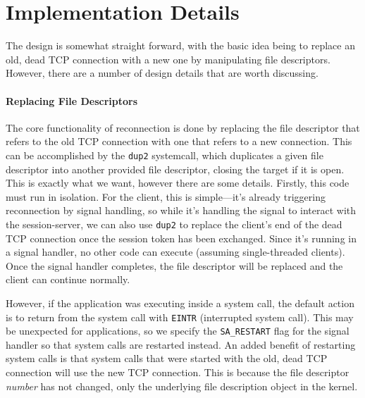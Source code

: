 \documentclass[twocolumn,11pt]{article}
\begin{document}
\section{Implementation Details}
\label{sec:impl}

The design is somewhat straight forward, with the basic idea being to replace an
old, dead TCP connection with a new one by manipulating file descriptors.
However, there are a number of design details that are worth discussing.

\paragraph{Replacing File Descriptors}
The core functionality of reconnection is done by replacing the file descriptor
that refers to the old TCP connection with one that refers to a new connection.
This can be accomplished by the \texttt{dup2} systemcall, which duplicates a
given file descriptor into another provided file descriptor, closing the target
if it is open. This is exactly what we want, however there are some details.
Firstly, this code must run in isolation. For the client, this is simple---it's
already triggering reconnection by signal handling, so while it's handling
the signal to interact with the session-server, we can also use \texttt{dup2} to
replace the client's end of the dead TCP connection once the session token has been
exchanged. Since it's running in a signal handler, no other code can execute
(assuming single-threaded clients). Once the signal handler completes, the file
descriptor will be replaced and the client can continue normally.

However, if the application was executing inside a system call, the default
action is to return from the system call with \texttt{EINTR} (interrupted system
call). This may be unexpected for applications, so we specify the
\texttt{SA\_RESTART} flag for the signal handler so that system calls are
restarted instead. An added benefit of restarting system calls is that system
calls that were started with the old, dead TCP connection will use the new TCP
connection. This is because the file descriptor \textit{number} has not changed,
only the underlying file description object in the kernel.
\end{document}
